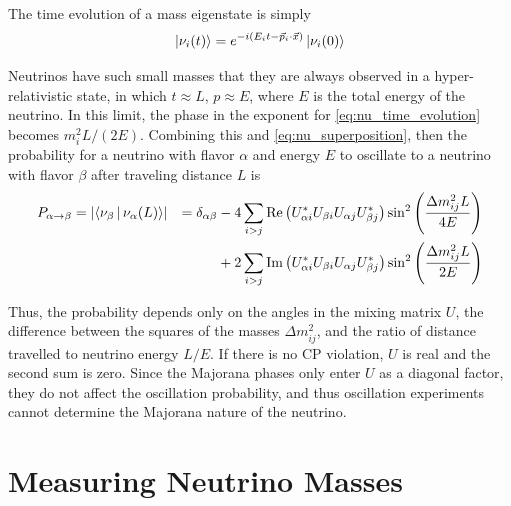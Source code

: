 \documentclass[herrin-thesis.tex]{subfiles}
\begin{document}
 The time evolution of a mass eigenstate is simply
 \begin{equation}
 \Ket{\nu_{i}(t)} = e^{-i(E_i t - \vec{p}_i\cdot\vec{x})}\Ket{\nu_i(0)}
 \label{eq:nu_time_evolution}
 \end{equation}

Neutrinos have such small masses that they are always observed in a hyper-relativistic state, in which \(t\approx L\), \(p\approx E\), where \(E\) is the total energy of the neutrino. In this limit, the phase in the exponent for \cref{eq:nu_time_evolution} becomes \(m_i^2 L/(2E)\). Combining this and \cref{eq:nu_superposition}, then the probability for a neutrino with flavor \(\alpha\) and energy \(E\) to oscillate to a neutrino with flavor \(\beta\) after traveling distance \(L\) is
\begin{align}
P_{\alpha\rightarrow\beta}	& = \left | \Braket{\nu_\beta | \nu_\alpha(L)} \right |	& = \delta_{\alpha\beta}	& - 4\sum_{i>j}\text{Re}\left(U_{\alpha i}^{*}U_{\beta i}U_{\alpha j}U_{\beta j}^{*}\right)\sin^2\left(\frac{\Delta m_{ij}^2 L}{4 E}\right)\nonumber\\
						&										&					& +2\sum_{i>j}\text{Im}\left(U_{\alpha i}^{*}U_{\beta i}U_{\alpha j}U_{\beta j}^{*}\right)\sin^2\left(\frac{\Delta m_{ij}^2 L}{2 E}\right)
\label{eq:nu_oscillation_prob}
\end{align}

Thus, the probability depends only on the angles in the mixing matrix \(U\), the difference between the squares of the masses \(\Delta m_{ij}^2\), and the ratio of distance travelled to neutrino energy \(L/E\). If there is no CP violation, \(U\) is real and the second sum is zero. Since the Majorana phases only enter \(U\) as a diagonal factor, they do not affect the oscillation probability, and thus oscillation experiments cannot determine the Majorana nature of the neutrino.

\section{Measuring Neutrino Masses}
\end{document}
